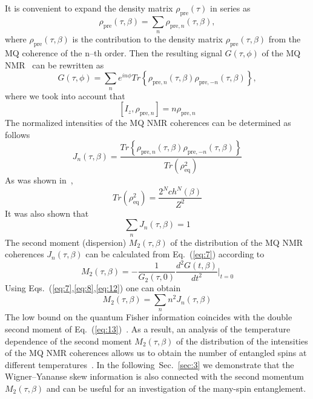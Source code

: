 \documentclass[preprint,12pt]{elsarticle}
\begin{document}
It is convenient to expand the density matrix $\rho_\mathrm{pre}(\tau)$ in series as~\cite{20}
\begin{equation}
    \label{eq:6}
        \rho_\mathrm{pre}(\tau,\beta) = \sum_n \rho_{\mathrm{pre},n}(\tau,\beta),
\end{equation}
where $\rho_\mathrm{pre}(\tau,\beta)$ is the contribution to the density matrix $\rho_\mathrm{pre}(\tau,\beta)$ from the MQ coherence of the n--th order.
Then the resulting signal $G(\tau,\phi)$ of the MQ NMR~\cite{9} can be rewritten as
\begin{equation} \label{eq:7}
    G(\tau, \phi) = \sum_n e^{in\phi}
        Tr\left\{\rho_{\mathrm{pre},n}(\tau,\beta)
        \rho_{\mathrm{pre},-n}(\tau,\beta) \right\},
\end{equation}
where we took into account that
\begin{equation}
    \label{eq:8}
        [I_z, \rho_{\mathrm{pre},n}] = n \rho_{\mathrm{pre},n}
\end{equation}
The normalized intensities of the MQ NMR coherences can be determined as follows
\begin{equation}
    \label{eq:9}
        J_n(\tau,\beta)= \frac{Tr\left\{\rho_{\mathrm{pre},n}(\tau,\beta)
            \rho_{\mathrm{pre},-n}(\tau,\beta)\right\}}
                {Tr(\rho^2_\mathrm{eq})}
\end{equation}
As was shown in~\cite{7},
\begin{equation}
    \label{eq:10}
        Tr(\rho_\mathrm{eq}^2) = \frac{2^N ch^N (\beta)}{Z^2}
\end{equation}
It was also shown that
\begin{equation}
    \label{eq:11}
        \sum_n J_n(\tau,\beta) = 1
\end{equation}
The second moment (dispersion) $M_2(\tau,\beta)$ of the distribution of the MQ NMR coherences $J_n (\tau,\beta)$ can be calculated from Eq.~(\ref{eq:7}) according to~\cite{21}
\begin{equation}
    \label{eq:12}
        M_2(\tau,\beta) = -\frac{1}{G_2(\tau,0)}
            \frac{d^2 G(t,\beta)}{dt^2}\bigg|
        _{t=0}
\end{equation}
Using Eqs.~(\ref{eq:7},\ref{eq:8},\ref{eq:12}) one can obtain
\begin{equation}
    \label{eq:13}
        M_2 (\tau,\beta) = \sum_n n^2 J_n(\tau,\beta)
\end{equation}
The low bound on the quantum Fisher information coincides with the double second moment of Eq.~(\ref{eq:13})~\cite{6,8}.
As a result, an analysis of the temperature dependence of the second moment $M_2(\tau,\beta)$ of the distribution of the intensities of the MQ NMR coherences allows us to obtain the number of entangled spins at different temperatures~\cite{7}.
In the following~Sec.~\ref{sec:3} we demonstrate that the Wigner--Yananse skew information is also connected with the second momentum $M_2(\tau,\beta)$
and can be useful for an investigation of the many-spin entanglement.
\end{document}
